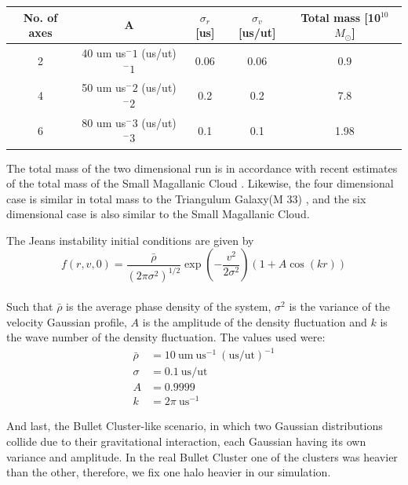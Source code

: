 \begin{table}[htb]
    \centering
    \label{tablaDelSuicidio}
	\begin{tabular}{|c|c|c|c|c| }
	\hline
	No. of axes & A & $\sigma_r$ [us] & $\sigma_v$ [us/ut] & Total mass [10$^{10}$ $M_{\odot}$] \\ \hline
	2 & 40 um us$^-1$ (us/ut)$^-1$ & 0.06 & 0.06 & 0.9  \\ \hline
	4 & 50 um us$^-2$ (us/ut)$^-2$  & 0.2 & 0.2 & 7.8  \\ \hline
	6 & 80 um us$^-3$ (us/ut)$^-3$ & 0.1 & 0.1 & 1.98 \\ \hline

	\end{tabular}
\end{table}

The total mass of the two dimensional run is in accordance with recent estimates of the total mass of the Small Magallanic Cloud \cite{2009MNRAS395342B}. Likewise, the four dimensional case is similar in total mass to the Triangulum Galaxy(M 33)\cite{2003MNRAS342199C} , and the six dimensional case is also similar to the Small Magallanic Cloud.

The Jeans instability initial conditions are given by 
\begin{equation}
f(r,v,0) = \frac{\bar{\rho}}{(2 \pi \sigma^2)^{1/2}} \exp(-\frac{v^2}{2 \sigma^2}) (1 + A \cos(kr))
\end{equation}\\
\vspace{-1mm}Such that $\bar{\rho}$ is the average phase density of the system, $\sigma^2$ is the variance of the velocity Gaussian profile, $A$ is the amplitude of the density fluctuation and $k$ is the wave number of the density fluctuation. The values used were:
\begin{align}
\bar{\rho} &= 10 \  \text{um} \ \text{us}^{-1} \ (\text{us/ut})^{-1} \\
\sigma &= 0.1 \ \text{us/ut} \\
A &= 0.9999 \\
k &= 2 \pi \ \text{us}^{-1}
\end{align}

And last, the Bullet Cluster-like scenario, in which two Gaussian distributions collide due to their gravitational interaction, each Gaussian having its own variance and amplitude.
In the real Bullet Cluster one of the clusters was heavier than the other, therefore, we fix one halo heavier in our simulation.

